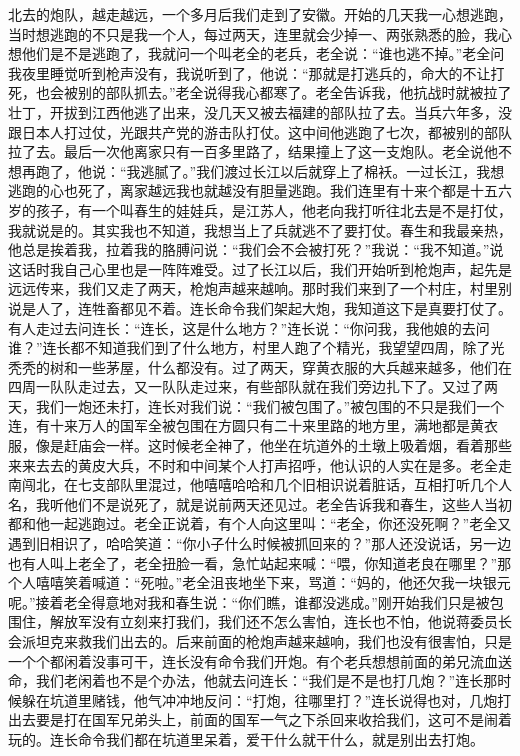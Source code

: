 \documentclass[12pt,UTF8]{ctexbook}
\begin{document}
北去的炮队，越走越远，一个多月后我们走到了安徽。开始的几天我一心想逃跑，当时想逃跑的不只是我一个人，每过两天，连里就会少掉一、两张熟悉的脸，我心想他们是不是逃跑了，我就问一个叫老全的老兵，老全说：“谁也逃不掉。”老全问我夜里睡觉听到枪声没有，我说听到了，他说：“那就是打逃兵的，命大的不让打死，也会被别的部队抓去。”老全说得我心都寒了。老全告诉我，他抗战时就被拉了壮丁，开拔到江西他逃了出来，没几天又被去福建的部队拉了去。当兵六年多，没跟日本人打过仗，光跟共产党的游击队打仗。这中间他逃跑了七次，都被别的部队拉了去。最后一次他离家只有一百多里路了，结果撞上了这一支炮队。老全说他不想再跑了，他说：“我逃腻了。”我们渡过长江以后就穿上了棉袄。一过长江，我想逃跑的心也死了，离家越远我也就越没有胆量逃跑。我们连里有十来个都是十五六岁的孩子，有一个叫春生的娃娃兵，是江苏人，他老向我打听往北去是不是打仗，我就说是的。其实我也不知道，我想当上了兵就逃不了要打仗。春生和我最亲热，他总是挨着我，拉着我的胳膊问说：“我们会不会被打死？”我说：“我不知道。”说这话时我自己心里也是一阵阵难受。过了长江以后，我们开始听到枪炮声，起先是远远传来，我们又走了两天，枪炮声越来越响。那时我们来到了一个村庄，村里别说是人了，连牲畜都见不着。连长命令我们架起大炮，我知道这下是真要打仗了。有人走过去问连长：“连长，这是什么地方？”连长说：“你问我，我他娘的去问谁？”连长都不知道我们到了什么地方，村里人跑了个精光，我望望四周，除了光秃秃的树和一些茅屋，什么都没有。过了两天，穿黄衣服的大兵越来越多，他们在四周一队队走过去，又一队队走过来，有些部队就在我们旁边扎下了。又过了两天，我们一炮还未打，连长对我们说：“我们被包围了。”被包围的不只是我们一个连，有十来万人的国军全被包围在方圆只有二十来里路的地方里，满地都是黄衣服，像是赶庙会一样。这时候老全神了，他坐在坑道外的土墩上吸着烟，看着那些来来去去的黄皮大兵，不时和中间某个人打声招呼，他认识的人实在是多。老全走南闯北，在七支部队里混过，他嘻嘻哈哈和几个旧相识说着脏话，互相打听几个人名，我听他们不是说死了，就是说前两天还见过。老全告诉我和春生，这些人当初都和他一起逃跑过。老全正说着，有个人向这里叫：“老全，你还没死啊？”老全又遇到旧相识了，哈哈笑道：“你小子什么时候被抓回来的？”那人还没说话，另一边也有人叫上老全了，老全扭脸一看，急忙站起来喊：“喂，你知道老良在哪里？”那个人嘻嘻笑着喊道：“死啦。”老全沮丧地坐下来，骂道：“妈的，他还欠我一块银元呢。”接着老全得意地对我和春生说：“你们瞧，谁都没逃成。”刚开始我们只是被包围住，解放军没有立刻来打我们，我们还不怎么害怕，连长也不怕，他说蒋委员长会派坦克来救我们出去的。后来前面的枪炮声越来越响，我们也没有很害怕，只是一个个都闲着没事可干，连长没有命令我们开炮。有个老兵想想前面的弟兄流血送命，我们老闲着也不是个办法，他就去问连长：“我们是不是也打几炮？”连长那时候躲在坑道里赌钱，他气冲冲地反问：“打炮，往哪里打？”连长说得也对，几炮打出去要是打在国军兄弟头上，前面的国军一气之下杀回来收拾我们，这可不是闹着玩的。连长命令我们都在坑道里呆着，爱干什么就干什么，就是别出去打炮。
\end{document}
